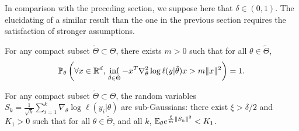 In comparison with the preceding section, we suppose here that $\delta\in(0,1)$.
The elucidating of a similar result than the one in the previous section requires the satisfaction of stronger assumptions.




\begin{assu}\label{assu:infeighes}
    For any compact subset $\tilde\Theta\subset\Theta$,
    there exists $m>0$ such that for all $\theta\in\tilde\Theta$,
    \begin{equation}
        \mathbb{P}_\theta\left(\forall x\in\mathbb{R}^d,\, \inf_{\tilde\theta\in\tilde\Theta}-x^T\nabla_\theta^2\log\ell(y|\tilde\theta)x>m\|x\|^2 \right) = 1.     
    \end{equation}
\end{assu}




\begin{assu}\label{assu:gausstailSk}
    For any compact subset $\tilde\Theta\subset\Theta$,
    the random variables
        $S_k=\frac{1}{\sqrt{k}}\sum_{i=1}^k\nabla_\theta\log\ell(y_i|\theta)    $
     are sub-Gaussians: there exist $\xi>\delta/2$ and $K_1>0$ such that for all $\theta\in\tilde\Theta$, and all $k$, $\mathbb{E}_\theta e^{\frac{\xi}{m}\|S_k\|^2}<K_1$.
\end{assu}







